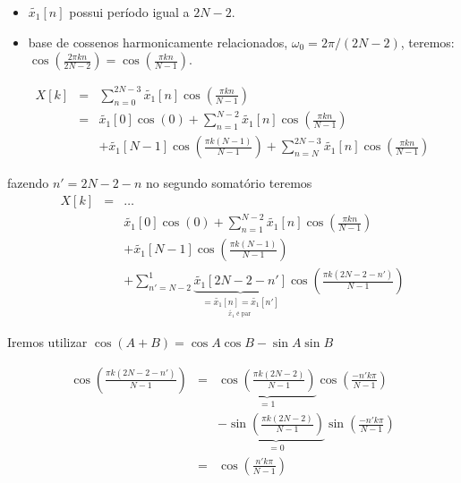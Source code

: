 \begin{frame}[allowframebreaks]
  \begin{itemize}
  \item $\tilde{x_1}[n]$ possui período igual a $2N-2$.
  \item base de cossenos harmonicamente relacionados, $\omega_0 = 2\pi/(2N-2)$, teremos: $\cos\left(\frac{2\pi k n}{2N-2} \right) = \cos\left(\frac{ \pi k n}{N-1}\right)$.
  \end{itemize}
  \begin{eqnarray}
  X[k] &=& \sum_{n=0}^{2N-3} \tilde{x_1}[n] \cos\left( \frac{\pi k n}{N-1} \right) \\
        &=& \tilde{x_1}[0] \cos(0) + \sum_{n=1}^{N-2} \tilde{x_1}[n] \cos\left( \frac{\pi k n}{N-1} \right)  \\
        && + \tilde{x_1}[N-1] \cos\left( \frac{\pi k (N-1)}{N-1} \right) + \sum_{n=N}^{2N-3} \tilde{x_1}[n] \cos\left( \frac{\pi k n}{N-1} \right) \nonumber 
  \end{eqnarray}

  \framebreak

  fazendo $n' = 2N-2-n$  no segundo somatório teremos
  \begin{eqnarray}
  X[k] &=& \ldots \nonumber \\
        && \tilde{x_1}[0] \cos(0) + \sum_{n=1}^{N-2} \tilde{x_1}[n] \cos\left( \frac{\pi k n}{N-1} \right)  \\
        && + \tilde{x_1}[N-1] \cos\left( \frac{\pi k (N-1)}{N-1} \right) \nonumber \\
        && + \sum_{n'=N-2}^{1} \underbrace{\tilde{x_1}[2N-2-n']}_{ \underset{\tilde{x_1} \text{ é par }}{ = \tilde{x_1}[n] = \tilde{x_1}[n']} } \cos\left( \frac{\pi k (2N-2-n')}{N-1} \right) \nonumber
  \end{eqnarray}

  \framebreak

  Iremos utilizar $\cos(A+B) = \cos A \cos B - \sin A \sin B$

  \begin{eqnarray}
  \cos\left( \frac{\pi k (2N-2-n')}{N-1} \right) &=& \underbrace{\cos\left( \frac{\pi k (2N-2)}{N-1} \right)}_{=1} \cos\left( \frac{-n' k \pi}{N-1} \right) \nonumber \\
        && -  \underbrace{\sin\left( \frac{\pi k (2N-2)}{N-1} \right)}_{=0} \sin\left( \frac{-n' k \pi}{N-1} \right) \nonumber \\
        &=& \cos\left( \frac{n' k \pi}{N-1} \right)
  \end{eqnarray}

  \framebreak


\end{frame}

